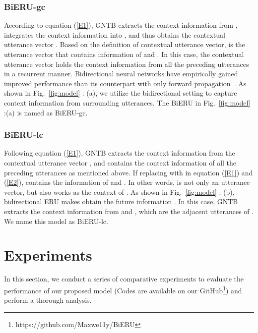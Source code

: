 \documentclass[journal]{IEEEtran}
\begin{document}
\subsubsection{BiERU-gc}
According to equation (\ref{E1}), GNTB extracts the context information from , integrates the context information into , and thus obtains the contextual utterance vector . Based on the definition of contextual utterance vector,  is the utterance vector that contains information of  and . In this case, the contextual utterance vector  holds the context information from all the preceding utterances  in a recurrent manner. 
{Bidirectional neural networks have empirically gained improved performance than its counterpart with only forward propagation~\cite{schuster1997bidirectional}. As shown in Fig.~\ref{fig:model} : (a), we utilize the bidirectional setting to capture context information from surrounding utterances.}
The BiERU in Fig.~\ref{fig:model} :(a) is named as BiERU-gc.
\subsubsection{BiERU-lc}
Following equation (\ref{E1}), GNTB extracts the context information from the contextual utterance vector , and  contains the context information of all the preceding utterances  as mentioned above. If replacing  with  in equation (\ref{E1}) and (\ref{E2}),  contains the information of  and . In other words,  is not only an utterance vector, but also works as the context of . As shown in Fig.~\ref{fig:model} : (b), bidirectional ERU makes  obtain the future information . In this case, GNTB extracts the context information from  and , which are the adjacent utterances of . We name this model as BiERU-lc.

\section{Experiments}
\label{sec:experiments}
In this section, we conduct a series of comparative experiments to evaluate the performance of our proposed model (Codes are available on our GitHub\footnote{https://github.com/Maxwe11y/BiERU}) and perform a thorough analysis.
\end{document}
